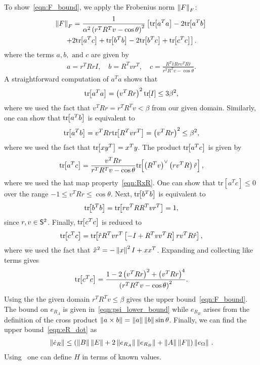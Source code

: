 \documentclass[letterpaper, 10 pt, conference]{ieeeconf}  %
\begin{document}
	To show~\cref{eqn:F_bound}, we apply the Frobenius norm \( \left\| F \right\|_F \):
	\begin{gather*}
		\left\| F \right\|_F = \frac{1}{\alpha ^2 \left( r^T R^T v - \cos \theta \right)^2} \left[\mathrm{tr}\negthickspace\left[ a^T a \right] - 2 \mathrm{tr}\negthickspace\left[ a^T b \right] \right. \\
		\left.+ 2 \mathrm{tr}\negthickspace\left[ a^T c  \right] + \mathrm{tr}\negthickspace\left[ b^T b \right]  - 2 \mathrm{tr}\negthickspace\left[ b^T c \right] + \mathrm{tr}\negthickspace\left[ c^T c \right]\right] .
	\end{gather*}
	where the terms \( a, b, \text{ and } c \) are given by
	\begin{gather*}
		a = r^T R r I , \quad	b = R^T v r^T , \quad c = \frac{R^T \hat{v} R r v^T R \hat{r}}{r^T R^T v - \cos \theta}.
	\end{gather*}
	A straightforward computation of \( a^T a \) shows that
	\begin{gather*}
		\mathrm{tr}\negthickspace\left[ a^T a \right] = \left( v^T R r \right)^2 \mathrm{tr}\negthickspace\left[ I \right] \leq 3 \beta^2 ,
	\end{gather*}
	where we used the fact that \( v^T R r = r^T R^T v < \beta \) from our given domain.
	Similarly, one can show that \( \mathrm{tr}\negthickspace\left[ a^T b \right] \) is equivalent to
	\begin{gather*}
		\mathrm{tr}\negthickspace\left[ a^T b \right] = v^T R r \mathrm{tr}\negthickspace\left[ R^T v r^T \right] = \left( v^T R r \right)^2 \leq \beta^2 ,
	\end{gather*} 
	where we used the fact that \( \mathrm{tr}\negthickspace\left[ x y^T \right] = x^T y \).
	The product \( \mathrm{tr}\negthickspace\left[ a^T c \right] \) is given by
	\begin{gather*}
		\mathrm{tr}\negthickspace\left[ a^T c \right] = \frac{v^T R r}{r^T R^T v - \cos \theta} \mathrm{tr}\negthickspace\left[ \left( R^T v \right)^\vee \left( r v^T R \right) \hat{r}  \right] ,
	\end{gather*}
	where we used the hat map property~\cref{eqn:RxR}.
	One can show that \(\mathrm{tr}[a^T c] \leq 0 \) over the range \( -1 \leq v^T R r \leq \cos \theta \). 
	Next, \( \mathrm{tr}\negthickspace\left[ b^T b \right]\) is equivalent to
	\begin{gather*}
		\mathrm{tr}\negthickspace\left[ b^T b \right] = \mathrm{tr}\negthickspace\left[ r v^T R R^T v r^T \right] = 1 ,
	\end{gather*}
	since \( r,v \in \mathsf{S}^2\).
	Finally, \( \mathrm{tr}\negthickspace\left[ c^T c \right] \) is reduced to
	\begin{gather*}
		\mathrm{tr}\negthickspace\left[ c^T c \right] = \mathrm{tr}\negthickspace\left[ \hat{r} R^T v r^T \left[ -I + R^T v v^T R \right] r v^T R \hat{r} \right] ,
	\end{gather*}
	where we used the fact that \( \hat{x}^2 = - \left\| x \right\|^2 I + x x^T\).
	Expanding and collecting like terms gives
	\begin{gather*}
		\mathrm{tr}\negthickspace\left[ c^T c  \right] = \frac{1 - 2\left( v^T R r \right)^2 + \left( v^T R r \right)^4}{\left( r^T R^T v - \cos \theta \right)^2} . 
	\end{gather*}
	Using the the given domain \( r^T R^T v \leq \beta \) gives the upper bound~\cref{eqn:F_bound}.
	The bound on \( e_{R_A} \) is given in~\cref{eqn:psi_lower_bound} while \( e_{R_B} \) arises from the definition of the cross product \( \left\| a \times b \right\| = \left\| a \right\| \left\| b \right\| \sin \theta \).
	Finally, we can find the upper bound~\cref{eqn:eR_dot} as
	\begin{gather*}
		\left\| \dot{e}_R \right\| \leq \left( \left\| B \right\| \left\| E \right\| + 2 \left\| e_{R_A} \right\| \left\| e_{R_B} \right\| + \left\| A \right\|\left\| F \right\| \right) \left\| e_\Omega \right\| \, .
	\end{gather*}
	Using~ one can define \( H \) in terms of known values.
\end{document}
